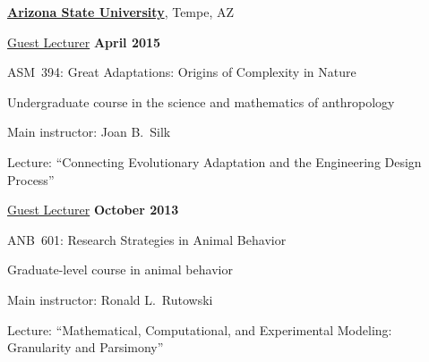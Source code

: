 \documentclass[10pt]{article}
\renewcommand\textit[1]{\underline{#1}}
\newcommand{\halfblankline}{\quad\vspace{-0.5\baselineskip}\pagebreak[3]}
\begin{document}
\href{http://www.asu.edu/}{\textbf{Arizona State University}},
Tempe, AZ
\begin{outerlist}

\item[] \textit{Guest Lecturer} \hfill \textbf{April 2015}
    \begin{innerlist}
        \item ASM~394: Great Adaptations: Origins of Complexity in Nature
        \begin{innerlist}
            \item Undergraduate course in the science and mathematics of anthropology
            \item Main instructor: Joan B.~Silk
            \item Lecture: ``Connecting Evolutionary Adaptation and the Engineering Design Process''
        \end{innerlist}
    \end{innerlist}

\item[] \textit{Guest Lecturer} \hfill \textbf{October 2013}
    \begin{innerlist}
        \item ANB~601: Research Strategies in Animal Behavior
        \begin{innerlist}
            \item Graduate-level course in animal behavior
            \item Main instructor: Ronald L.~Rutowski
            \item Lecture: ``Mathematical, Computational, and Experimental Modeling: Granularity and Parsimony''
        \end{innerlist}
    \end{innerlist}

\end{outerlist}

\halfblankline
\end{document}
